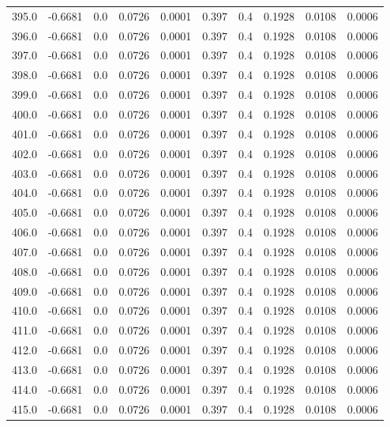 \begin{longtable}{lrrrrrrrrr}
395.0 & -0.6681 & 0.0 & 0.0726 & 0.0001 & 0.397 & 0.4 & 0.1928 & 0.0108 & 0.0006 \\
396.0 & -0.6681 & 0.0 & 0.0726 & 0.0001 & 0.397 & 0.4 & 0.1928 & 0.0108 & 0.0006 \\
397.0 & -0.6681 & 0.0 & 0.0726 & 0.0001 & 0.397 & 0.4 & 0.1928 & 0.0108 & 0.0006 \\
398.0 & -0.6681 & 0.0 & 0.0726 & 0.0001 & 0.397 & 0.4 & 0.1928 & 0.0108 & 0.0006 \\
399.0 & -0.6681 & 0.0 & 0.0726 & 0.0001 & 0.397 & 0.4 & 0.1928 & 0.0108 & 0.0006 \\
400.0 & -0.6681 & 0.0 & 0.0726 & 0.0001 & 0.397 & 0.4 & 0.1928 & 0.0108 & 0.0006 \\
401.0 & -0.6681 & 0.0 & 0.0726 & 0.0001 & 0.397 & 0.4 & 0.1928 & 0.0108 & 0.0006 \\
402.0 & -0.6681 & 0.0 & 0.0726 & 0.0001 & 0.397 & 0.4 & 0.1928 & 0.0108 & 0.0006 \\
403.0 & -0.6681 & 0.0 & 0.0726 & 0.0001 & 0.397 & 0.4 & 0.1928 & 0.0108 & 0.0006 \\
404.0 & -0.6681 & 0.0 & 0.0726 & 0.0001 & 0.397 & 0.4 & 0.1928 & 0.0108 & 0.0006 \\
405.0 & -0.6681 & 0.0 & 0.0726 & 0.0001 & 0.397 & 0.4 & 0.1928 & 0.0108 & 0.0006 \\
406.0 & -0.6681 & 0.0 & 0.0726 & 0.0001 & 0.397 & 0.4 & 0.1928 & 0.0108 & 0.0006 \\
407.0 & -0.6681 & 0.0 & 0.0726 & 0.0001 & 0.397 & 0.4 & 0.1928 & 0.0108 & 0.0006 \\
408.0 & -0.6681 & 0.0 & 0.0726 & 0.0001 & 0.397 & 0.4 & 0.1928 & 0.0108 & 0.0006 \\
409.0 & -0.6681 & 0.0 & 0.0726 & 0.0001 & 0.397 & 0.4 & 0.1928 & 0.0108 & 0.0006 \\
410.0 & -0.6681 & 0.0 & 0.0726 & 0.0001 & 0.397 & 0.4 & 0.1928 & 0.0108 & 0.0006 \\
411.0 & -0.6681 & 0.0 & 0.0726 & 0.0001 & 0.397 & 0.4 & 0.1928 & 0.0108 & 0.0006 \\
412.0 & -0.6681 & 0.0 & 0.0726 & 0.0001 & 0.397 & 0.4 & 0.1928 & 0.0108 & 0.0006 \\
413.0 & -0.6681 & 0.0 & 0.0726 & 0.0001 & 0.397 & 0.4 & 0.1928 & 0.0108 & 0.0006 \\
414.0 & -0.6681 & 0.0 & 0.0726 & 0.0001 & 0.397 & 0.4 & 0.1928 & 0.0108 & 0.0006 \\
415.0 & -0.6681 & 0.0 & 0.0726 & 0.0001 & 0.397 & 0.4 & 0.1928 & 0.0108 & 0.0006 \\

\end{longtable}
